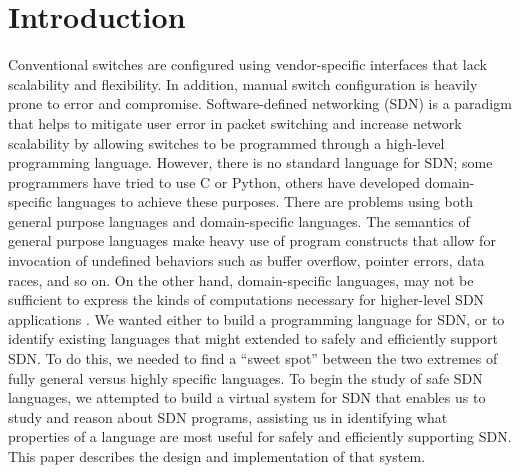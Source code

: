 
\section{Introduction}


Conventional switches are configured using vendor-specific interfaces that lack scalability and flexibility. In addition, manual switch configuration is heavily prone to error and compromise. Software-defined networking (SDN) is a paradigm that helps to mitigate user error in packet switching and increase network scalability by allowing switches to be programmed through a high-level programming language. However, there is no standard language for SDN; some programmers have tried to use C or Python, others have developed domain-specific languages to achieve these purposes. There are problems using both general purpose languages and domain-specific languages. The semantics of general purpose languages make heavy use of program constructs that allow for invocation of undefined behaviors such as buffer overflow, pointer errors, data races, and so on. On the other hand, domain-specific languages, may not be sufficient to express the kinds of computations necessary for higher-level SDN applications \Cite{Nguyen2016}. We wanted either to build a programming language for SDN, or to identify existing languages that might extended to safely and efficiently support SDN. To do this, we needed to find a ``sweet spot'' between the two extremes of fully general versus highly specific languages. To begin the study of safe SDN languages, we attempted to build a virtual system for SDN that enables us to study and reason about SDN programs, assisting us in identifying what properties of a language are most useful for safely and efficiently supporting SDN. This paper describes the design and implementation of that system.


